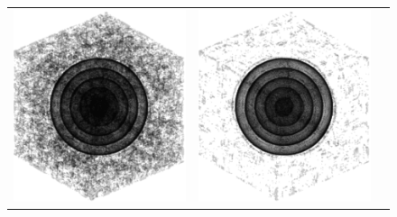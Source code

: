 \documentclass[9pt]{beamer}
\begin{document}
\begin{frame}
			
					\begin{figure}
						\begin{tabular}{c c c }
													\includegraphics[scale=0.2]{Threshold50}&
													\includegraphics[scale=0.2]{Threshold75}&

\end{tabular}
\end{figure}
\end{frame}
\end{document}
